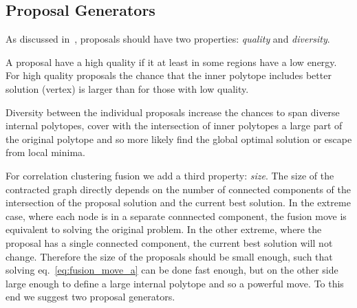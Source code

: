 \documentclass[10pt,twocolumn,letterpaper]{article}
\newtheorem{remark}{Remark}
\theoremstyle{definition}
\newcommand{\OR}{\textrm{ or }}
\begin{document}

\subsection{Proposal Generators}

As discussed in~\cite{Lempitsky-2010}, proposals
should have two properties: \emph{quality} 
and \emph{diversity}.

A proposal have a high quality if it at least in some regions have a low energy.
For high quality proposals the chance that the inner polytope includes 
better solution (vertex) is larger than for those with low quality.

Diversity between the individual proposals increase the chances
to span diverse internal polytopes, cover with the intersection of
inner polytopes a large part of the original polytope and so  
more likely find the global optimal solution or escape from local minima.

For correlation clustering fusion we add a third
property: \emph{size}.
The size of the contracted graph directly
depends on the number of connected components
of the intersection of the proposal solution and the current best solution.
%
In the extreme case, where each 
node is in a separate connnected component,
the fusion move is equivalent to solving the original problem.
In the other extreme, where the proposal has 
a single connected component, the current best solution will not change.
% 
Therefore the size of the proposals
should be small enough, such that solving
eq.~\ref{eq:fusion_move_a} can
be done fast enough, but  on the other side 
large enough to define a large internal polytope and so a powerful move.
%
To this end we suggest two proposal generators.
\end{document}
